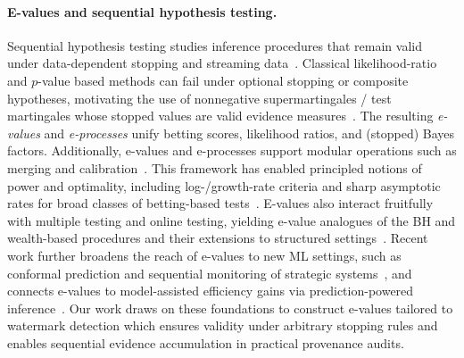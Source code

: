 \paragraph{E-values and sequential hypothesis testing.}
Sequential hypothesis testing studies inference procedures that remain valid under data-dependent stopping and streaming data~\citep{WaldSequentialAnalysis1947,Robbins1952SomeAO,breimualphanu2011optimal}.
Classical likelihood-ratio and $p$-value based methods can fail under optional stopping or composite hypotheses, motivating the use of nonnegative supermartingales / test martingales whose stopped values are valid evidence measures~\citep{shafer2011testmartingales,vovk2021values,Shafer2021Testing,grunwald2020safe,ramdas2023game}.
The resulting \emph{e-values} and \emph{e-processes} unify betting scores, likelihood ratios, and (stopped) Bayes factors. Additionally, e-values and e-processes support modular operations such as merging and calibration~\citep{vovk2021values,ramdasWang2025hypevalues}.
This framework has enabled principled notions of power and optimality, including log-/growth-rate criteria and sharp asymptotic rates for broad classes of betting-based tests~\citep{grunwald2020safe,waudby2025universal}.
E-values also interact fruitfully with multiple testing and online testing, yielding e-value analogues of the BH and wealth-based procedures and their extensions to structured settings~\citep{wangramdas2022fdrevalues,ramdas2017decayingmemory,ramdas2018saffron,ramdas2019dagger}.
Recent work further broadens the reach of e-values to new ML settings, such as conformal prediction and sequential monitoring of strategic systems~\citep{gauthier2025conformal_evalues,gauthier2026bettingequilibrium,aolaritei2025sgdcs}, and connects e-values to model-assisted efficiency gains via prediction-powered inference~\citep{wasserman2020universal,csillag2025predictionpoweredevalues}.
Our work draws on these foundations to construct e-values tailored to watermark detection which ensures validity under arbitrary stopping rules and enables sequential evidence accumulation in practical provenance audits.

